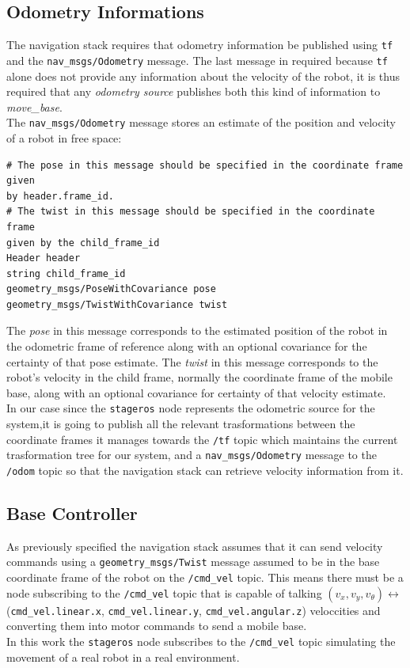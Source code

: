 \subsection*{Odometry Informations}
The navigation stack requires that odometry information be published using 
\texttt{tf} and the \texttt{nav\_msgs/Odometry} message. The last message in 
required because \texttt{tf} alone does not provide any information about the 
velocity of the robot, it is thus required that any \textit{odometry source} 
publishes both this kind of information to \textit{move\_base}.
\\
The \texttt{nav\_msgs/Odometry} message stores an estimate of the position and 
velocity of a robot in free space:
\begin{lstlisting}
# The pose in this message should be specified in the coordinate frame given
by header.frame_id.
# The twist in this message should be specified in the coordinate frame
given by the child_frame_id
Header header
string child_frame_id
geometry_msgs/PoseWithCovariance pose
geometry_msgs/TwistWithCovariance twist
\end{lstlisting}
The \textit{pose} in this message corresponds to the estimated position of the 
robot in the odometric frame of reference along with an optional covariance for 
the certainty of that pose estimate. The \textit{twist} in this message corresponds
to the robot's velocity in the child frame, normally the coordinate frame of the 
mobile base, along with an optional covariance for certainty of that velocity estimate.
\\
In our case since the \texttt{stageros} node represents the odometric source for 
the system,it is going to publish all the relevant trasformations between the
coordinate frames it manages towards the \texttt{/tf} topic which maintains the current 
trasformation tree for our system, and a \texttt{nav\_msgs/Odometry} message to 
the \texttt{/odom} topic so that the navigation stack can retrieve velocity information
from it.

\subsection*{Base Controller}
As previously specified the navigation stack assumes that it can send velocity commands
using a \texttt{geometry\_msgs/Twist} message assumed to be in the base coordinate
frame of the robot on the \texttt{/cmd\_vel} topic. This means there must be a node 
subscribing to the \texttt{/cmd\_vel} topic that is capable of talking 
$(v_x,v_y,v_\theta) \longleftrightarrow $ (\texttt{cmd\_vel.linear.x}, \texttt{cmd\_vel.linear.y}, \texttt{cmd\_vel.angular.z})
veloccities and converting them into motor commands to send a mobile base.
\\
In this work the \texttt{stageros} node subscribes to the \texttt{/cmd\_vel} topic
simulating the movement of a real robot in a real environment.

